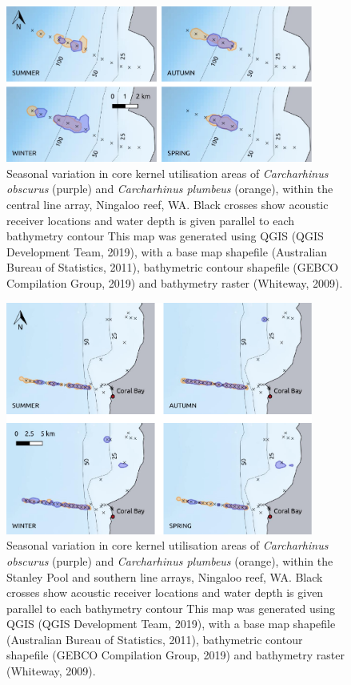 \documentclass[11pt,a4paper]{article}
\begin{document}
	\begin{figure}[h!]
		\centering\includegraphics[width=0.9\textwidth]{../Results/mid.pdf}
		\caption{Seasonal variation in core kernel utilisation areas of \textit{Carcharhinus obscurus} (purple) and \textit{Carcharhinus plumbeus} (orange), within the central line array, Ningaloo reef, WA. Black crosses show acoustic receiver locations and water depth is given parallel to each bathymetry contour This map was generated using QGIS (QGIS Development Team, 2019), with a base map shapefile (Australian Bureau of Statistics, 2011), bathymetric contour shapefile (GEBCO Compilation Group, 2019) and bathymetry raster (Whiteway, 2009).}
		\label{depth_mid}
	\end{figure}		
	
	\begin{figure}[h!]
		\centering\includegraphics[width=0.9\textwidth]{../Results/Coral_bay.pdf}
		\caption{Seasonal variation in core kernel utilisation areas of \textit{Carcharhinus obscurus} (purple) and \textit{Carcharhinus plumbeus} (orange), within the Stanley Pool and southern line arrays, Ningaloo reef, WA. Black crosses show acoustic receiver locations and water depth is given parallel to each bathymetry contour This map was generated using QGIS (QGIS Development Team, 2019), with a base map shapefile (Australian Bureau of Statistics, 2011), bathymetric contour shapefile (GEBCO Compilation Group, 2019) and bathymetry raster (Whiteway, 2009).}
		\label{depth_south}
	\end{figure}		
	
\end{document}
